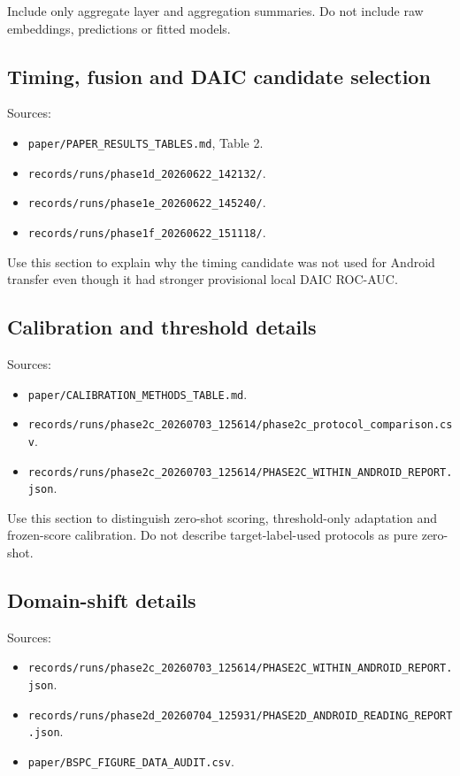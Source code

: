 \documentclass[lettersize,journal]{IEEEtran}
\begin{document}
Include only aggregate layer and aggregation summaries. Do not include raw embeddings, predictions or fitted models.

\subsection{Timing, fusion and DAIC candidate selection}

Sources:

\begin{itemize}
\item \texttt{paper/PAPER\_RESULTS\_TABLES.md}, Table 2.
\item \texttt{records/runs/phase1d\_20260622\_142132/}.
\item \texttt{records/runs/phase1e\_20260622\_145240/}.
\item \texttt{records/runs/phase1f\_20260622\_151118/}.
\end{itemize}

Use this section to explain why the timing candidate was not used for Android transfer even though it had stronger provisional local DAIC ROC-AUC.

\subsection{Calibration and threshold details}

Sources:

\begin{itemize}
\item \texttt{paper/CALIBRATION\_METHODS\_TABLE.md}.
\item \texttt{records/runs/phase2c\_20260703\_125614/phase2c\_protocol\_comparison.csv}.
\item \texttt{records/runs/phase2c\_20260703\_125614/PHASE2C\_WITHIN\_ANDROID\_REPORT.json}.
\end{itemize}

Use this section to distinguish zero-shot scoring, threshold-only adaptation and frozen-score calibration. Do not describe target-label-used protocols as pure zero-shot.

\subsection{Domain-shift details}

Sources:

\begin{itemize}
\item \texttt{records/runs/phase2c\_20260703\_125614/PHASE2C\_WITHIN\_ANDROID\_REPORT.json}.
\item \texttt{records/runs/phase2d\_20260704\_125931/PHASE2D\_ANDROID\_READING\_REPORT.json}.
\item \texttt{paper/BSPC\_FIGURE\_DATA\_AUDIT.csv}.
\end{itemize}
\end{document}
